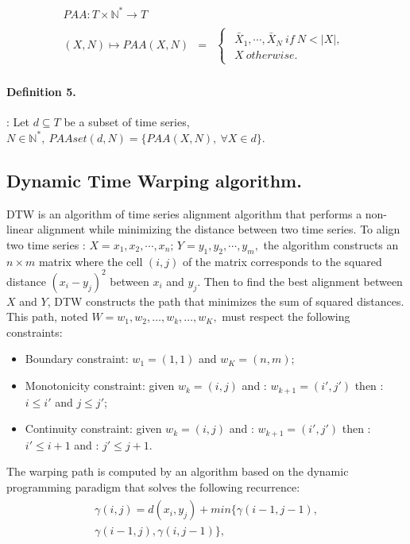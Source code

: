 \begin{eqnarray}
\begin{array}{ccc}
 PAA: T\times\mathbb{N^{*}}\rightarrow T\\
\\
(X,N)\mapsto PAA(X,N) & = &
 \begin{cases}
 \begin{array}{c}
\bar{X}_{1},\cdots,\bar{X}_{N}\:if\:N<|X|,\\
X\:otherwise.
\end{array}
\end{cases}
\end{array}
\end{eqnarray}


\paragraph{Definition 5.}:
Let $d\subseteq T$ be a subset of time series,
$N\in\mathbb{N}^{*},\:PAAset(d,N)=\{PAA(X,N),\:\forall X\in d\}.$


\subsection{Dynamic Time Warping algorithm.}
DTW \cite{sakoe1978dynamic} is an algorithm of time series alignment
algorithm that  performs a non-linear alignment while
minimizing the distance between two time series. To align two time series : 
$X=x_{1},x_{2},\cdots,x_{n};\,
Y=y_{1},y_{2},\cdots,y_{m},$ the algorithm constructs an  $n\times m$  matrix where the cell $(i,
j)$ of the matrix corresponds to the squared distance $(x_{i}-y_{j})^{2}$ between $x_{i}$
and $y_{j}$. Then to find the best alignment between $X$ and $Y$, DTW constructs the path that minimizes the sum of squared distances. This path, noted
$W = w_1, w_2, \ldots, w_k, \ldots, w_K,$ must respect the following constraints:
\begin{itemize}
  \item Boundary constraint: $w_1 = (1, 1)$ and  $w_K = (n, m)$;
  \item Monotonicity constraint: given $w_k = (i, j)$ and :  $w_{k + 1} =
  (i',j')$ then : $i \leq i'$ and $j \leq j'$;
 \item Continuity constraint: given $w_k = (i, j)$ and :   $w_{k + 1} = (i', j')$
 then : $i' \leq i + 1$ and : $j' \leq j + 1$.
\end{itemize}
The warping path is computed by  an algorithm based on the dynamic
programming paradigm that solves the following recurrence:
\begin{eqnarray}
\begin{array}{l}
\gamma(i,j)=d(x_{i},y_{j}) + min\{\gamma(i-1, j-1), \\
\gamma(i-1, j),\gamma(i, j-1)\},
\end{array}
\end{eqnarray}


